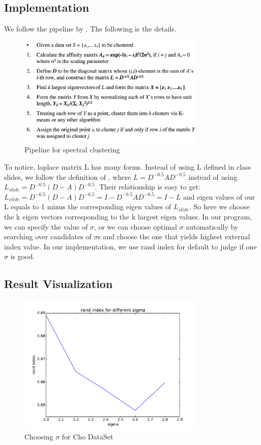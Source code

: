 \documentclass[paper=letter, fontsize=11pt]{article}
\numberwithin{equation}{section}		%
\numberwithin{figure}{section}			%
\numberwithin{table}{section}				%
\begin{document}
\subsection{Implementation}
We follow the pipeline by \cite{sp_clustering}. The following is the details.

\begin{figure}[H]
	\centering
	\includegraphics[width=0.8\textwidth]{sp_pipeline.png}
	\caption{Pipeline for spectral clustering }
\end{figure}

To notice, laplace matrix L has many forms. Instead of using L defined in class slides, we follow the definition of \cite{sp_clustering}, where  $L= D^{-0.5}AD^{-0.5}$ instead of using $L_{slide}= D^{-0.5}(D-A)D^{-0.5}$. Their relationship is easy to get: $L_{slide}= D^{-0.5}(D-A)D^{-0.5}= I - D^{-0.5}AD^{-0.5} = I - L$ and eigen values of our L equals to 1 minus the corresponding eigen values of $L_{slide}$. So here we choose the k eigen vectors corresponding to the k largest eigen values. In our program, we can specify the value of  $\sigma$,  or we can choose  optimal $\sigma$ automatically by searching over candidates of $\sigma$s and choose the one that yields highest external index value. In our implementation, we use rand index for default to judge if one $\sigma$ is good.   
\subsection{Result Visualization}

\begin{figure}[H]
	\centering
	\includegraphics[width=0.8\textwidth]{choose_sigma_cho.pdf}
	\caption{Choosing $\sigma$ for Cho DataSet  }
\end{figure}
\end{document}
